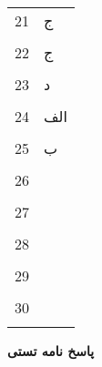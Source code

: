 \documentclass[a4paper,11pt]{article}
\begin{document}
\begin{multicols}{3}
\begin{enumerate}
	\begin{tabular}[c]{||p{1cm}|p{2cm}|}
		\hline
		\hline
		21&ج\\ & \\
		\hline
		22&ج\\ & \\
		\hline
		23&د\\ & \\
		\hline
		24&الف\\ & \\
		\hline
		25&ب\\ & \\
		\hline
		26&\\ & \\
		\hline
		27&\\ & \\
		\hline
		28&\\ & \\
		\hline
		29&\\ & \\
		\hline
		30&\\ & \\
		\hline
	\end{tabular}
	\end{enumerate}
\end{multicols}
\newpage
\bf{پاسخ نامه تستی}
\end{document}
